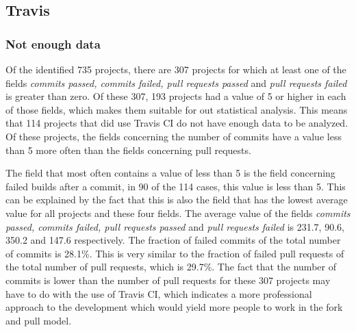 \subsection{Travis}

\subsubsection*{Not enough data}
Of the identified 735 projects, there are 307 projects for which at least one of the fields \textit{commits passed, commits failed, pull requests passed} and \textit{pull requests failed} is greater than zero.
Of these 307, 193 projects had a value of 5 or higher in each of those fields, which makes them suitable for out statistical analysis.
This means that 114 projects that did use Travis CI do not have enough data to be analyzed. 
Of these projects, the fields concerning the number of commits have a value less than 5 more often than the fields concerning pull requests.

The field that most often contains a value of less than 5 is the field concerning failed builds after a commit, in 90 of the 114 cases, this value is less than 5.
This can be explained by the fact that this is also the field that has the lowest average value for all projects and these four fields. 
The average value of the fields \textit{commits passed, commits failed, pull requests passed} and \textit{pull requests failed} is 231.7, 90.6, 350.2 and 147.6 respectively.
The fraction of failed commits of the total number of commits is 28.1\%. This is very similar to the fraction of failed pull requests of the total number of pull requests, which is 29.7\%.
The fact that the number of commits is lower than the number of pull requests for these 307 projects may have to do with the use of Travis CI, which indicates a more professional approach to the development which would yield more people to work in the fork and pull model.

